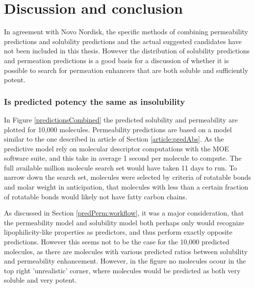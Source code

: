 \chapter{Discussion and conclusion}

In agreement with Novo Nordisk, the specific methods of combining permeability predictions and solubility predictions and the actual suggested candidates have not been included in this thesis. However the distribution of solubility predictions and permeation predictions is a good basis for a discussion of whether it is possible to search for permeation enhancers that are both soluble and sufficiently potent.

\subsection{Is predicted potency the same as insolubility}
In Figure \ref{predictionsCombined} the predicted solubility and permeability are plotted for 10,000 molecules. Permeability predictions are based on a model similar to the one described in article of Section \ref{article:predAbs}. As the predictive model rely on molecular descriptor computations with the MOE software suite, and this take in average 1 second per molecule to compute. The full available million molecule search set would have taken 11 days to run. To narrow down the search set, molecules were selected by criteria of rotatable bonds and molar weight in anticipation, that molecules with less than a certain fraction of rotatable bonds would likely not have fatty carbon chains.

As discussed in Section \ref{predPerm:workflow}, it was a major consideration, that the permeability model and solubility model both perhaps only would recognize lipophilicity-like properties as predictors, and thus perform exactly opposite predictions. However this seems not to be the case for the 10,000 predicted molecules, as there are molecules with various predicted ratios between solubility and permeability enhancement. However, in the figure no molecules ocour in the top right 'unrealistic' corner, where molecules would be predicted as both very soluble and very potent.

